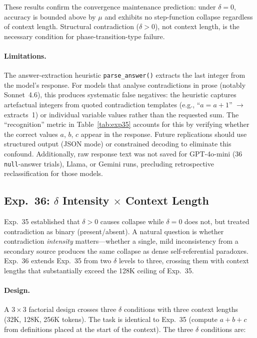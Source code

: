 \documentclass[11pt,a4paper]{article}
\begin{document}
\noindent These results confirm the convergence maintenance prediction: under $\delta = 0$, accuracy is bounded above by $\mu$ and exhibits no step-function collapse regardless of context length. Structural contradiction ($\delta > 0$), not context length, is the necessary condition for phase-transition-type failure.

\paragraph{Limitations.}
\label{sec:exp35-limitations}
The answer-extraction heuristic \texttt{parse\_answer()} extracts the last integer from the model's response. For models that analyse contradictions in prose (notably Sonnet~4.6), this produces systematic false negatives: the heuristic captures artefactual integers from quoted contradiction templates (e.g., ``$a = a + 1$'' $\to$ extracts~1) or individual variable values rather than the requested sum. The ``recognition'' metric in Table~\ref{tab:exp35} accounts for this by verifying whether the correct values $a$, $b$, $c$ appear in the response. Future replications should use structured output (JSON mode) or constrained decoding to eliminate this confound. Additionally, raw response text was not saved for GPT-4o-mini (36 \texttt{null}-answer trials), Llama, or Gemini runs, precluding retrospective reclassification for those models.

\subsection{Exp.~36: $\delta$ Intensity $\times$ Context Length}
\label{sec:exp36}

Exp.~35 established that $\delta > 0$ causes collapse while $\delta = 0$ does not, but treated contradiction as binary (present/absent). A natural question is whether contradiction \emph{intensity} matters---whether a single, mild inconsistency from a secondary source produces the same collapse as dense self-referential paradoxes. Exp.~36 extends Exp.~35 from two $\delta$ levels to three, crossing them with context lengths that substantially exceed the 128K ceiling of Exp.~35.

\paragraph{Design.}
A $3 \times 3$ factorial design crosses three $\delta$ conditions with three context lengths (32K, 128K, 256K tokens). The task is identical to Exp.~35 (compute $a + b + c$ from definitions placed at the start of the context). The three $\delta$ conditions are:
\end{document}
